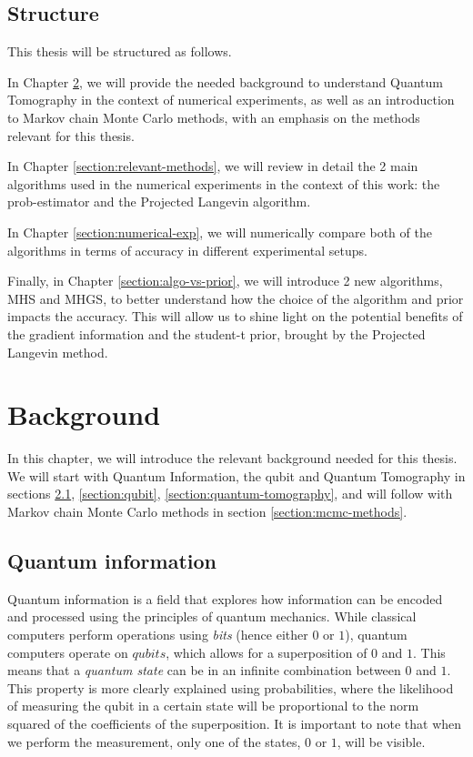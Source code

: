 \documentclass[12pt]{memoir}
\begin{document}
\section{Structure}
This thesis will be structured as follows.\medbreak

In Chapter \ref{section:background}, we will provide the needed background to understand Quantum Tomography in the context of numerical experiments, as well as an introduction to Markov chain Monte Carlo methods, with an emphasis on the methods relevant for this thesis.\medbreak

In Chapter \ref{section:relevant-methods}, we will review in detail the 2 main algorithms used in the numerical experiments in the context of this work: the prob-estimator and the Projected Langevin algorithm.\medbreak

In Chapter \ref{section:numerical-exp}, we will numerically compare both of the algorithms in terms of accuracy in different experimental setups.\medbreak

Finally, in Chapter \ref{section:algo-vs-prior}, we will introduce 2 new algorithms, MHS and MHGS, to better understand how the choice of the algorithm and prior impacts the accuracy. This will allow us to shine light on the potential benefits of the gradient information and the student-t prior, brought by the Projected Langevin method.


\chapter{Background}\label{section:background}

In this chapter, we will introduce the relevant background needed for this thesis. We will start with Quantum Information, the qubit and Quantum Tomography in sections \ref{section:quantum-information}, \ref{section:qubit}, \ref{section:quantum-tomography}, and will follow with Markov chain Monte Carlo methods in section \ref{section:mcmc-methods}.

\section{Quantum information}\label{section:quantum-information}

Quantum information is a field that explores how information can be encoded and processed using the principles of quantum mechanics. While classical computers perform operations using \textit{bits} (hence either $0$ or $1$), quantum computers operate on $qubits$, which allows for a superposition of $0$ and $1$. This means that a \textit{quantum state} can be in an infinite combination between $0$ and $1$. This property is more clearly explained using probabilities, where the likelihood of measuring the qubit in a certain state will be proportional to the norm squared of the coefficients of the superposition. It is important to note that when we perform the measurement, only one of the states, $0$ or $1$, will be visible.\medbreak
\end{document}
